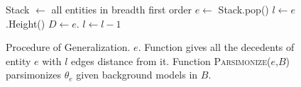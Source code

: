\begin{figure}[!t]
\centering
\begin{algorithm}[H]
\captionsetup{labelformat=empty}
\begin{algorithmic}[1]
\State Stack $\gets$ all entities in breadth first order
  \State $e \gets$ Stack.pop()
  \State $l \gets e$.Height()
    \State $D \gets e$.
    \State {}
    \State $l \gets l-1$  
  \EndWhile
\EndWhile
\EndProcedure
\end{algorithmic}
\end{algorithm}
\vspace{-10pt}
\caption{\label{alg:generalization_stage}Procedure of Generalization. $e$. Function  gives all the decedents of entity $e$ with $l$ edges distance from it. Function \textsc{Parsimonize}($e$,$B$)  parsimonizes $\theta_e$ given background models in $B$.}
\end{figure}